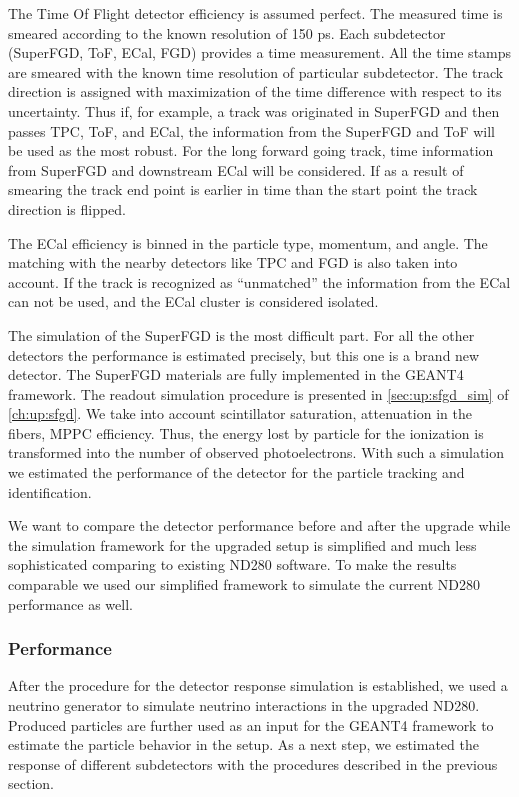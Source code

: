 \documentclass[main.tex]{subfiles}
\begin{document}
The Time Of Flight detector efficiency is assumed perfect. The measured time is smeared according to the known resolution of 150 ps. Each subdetector (SuperFGD, ToF, ECal, FGD) provides a time measurement. All the time stamps are smeared with the known time resolution of particular subdetector. The track direction is assigned with maximization of the time difference with respect to its uncertainty. Thus if, for example, a track was originated in SuperFGD and then passes TPC, ToF, and ECal, the information from the SuperFGD and ToF will be used as the most robust. For the long forward going track, time information from SuperFGD and downstream ECal will be considered. If as a result of smearing the track end point is earlier in time than the start point the track direction is flipped.

The ECal efficiency is binned in the particle type, momentum, and angle. The matching with the nearby detectors like TPC and FGD is also taken into account. If the track is recognized as ``unmatched'' the information from the ECal can not be used, and the ECal cluster is considered isolated.

The simulation of the SuperFGD is the most difficult part. For all the other detectors the performance is estimated precisely, but this one is a brand new detector. The SuperFGD materials are fully implemented in the GEANT4 framework. The readout simulation procedure is presented in \autoref{sec:up:sfgd_sim} of \autoref{ch:up:sfgd}. We take into account scintillator saturation, attenuation in the fibers, MPPC efficiency. Thus, the energy lost by particle for the ionization is transformed into the number of observed photoelectrons. With such a simulation we estimated the performance of the detector for the particle tracking and identification.

We want to compare the detector performance before and after the upgrade while the simulation framework for the upgraded setup is simplified and much less sophisticated comparing to existing ND280 software. To make the results comparable we used our simplified framework to simulate the current ND280 performance as well.

\subsubsection{Performance}
After the procedure for the detector response simulation is established, we used a neutrino generator to simulate neutrino interactions in the upgraded ND280. Produced particles are further used as an input for the GEANT4 framework to estimate the particle behavior in the setup. As a next step, we estimated the response of different subdetectors with the procedures described in the previous section.
\end{document}
